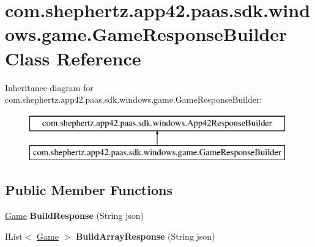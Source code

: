 \hypertarget{classcom_1_1shephertz_1_1app42_1_1paas_1_1sdk_1_1windows_1_1game_1_1_game_response_builder}{\section{com.\+shephertz.\+app42.\+paas.\+sdk.\+windows.\+game.\+Game\+Response\+Builder Class Reference}
\label{classcom_1_1shephertz_1_1app42_1_1paas_1_1sdk_1_1windows_1_1game_1_1_game_response_builder}
}
Inheritance diagram for com.\+shephertz.\+app42.\+paas.\+sdk.\+windows.\+game.\+Game\+Response\+Builder\+:\begin{figure}[H]
\begin{center}
\leavevmode
\includegraphics[height=2.000000cm]{classcom_1_1shephertz_1_1app42_1_1paas_1_1sdk_1_1windows_1_1game_1_1_game_response_builder}
\end{center}
\end{figure}
\subsection*{Public Member Functions}
\begin{DoxyCompactItemize}
\item 
\hypertarget{classcom_1_1shephertz_1_1app42_1_1paas_1_1sdk_1_1windows_1_1game_1_1_game_response_builder_a592407f2cab7b47824fb96970491159e}{\hyperlink{classcom_1_1shephertz_1_1app42_1_1paas_1_1sdk_1_1windows_1_1game_1_1_game}{Game} {\bfseries Build\+Response} (String json)}\label{classcom_1_1shephertz_1_1app42_1_1paas_1_1sdk_1_1windows_1_1game_1_1_game_response_builder_a592407f2cab7b47824fb96970491159e}

\item 
\hypertarget{classcom_1_1shephertz_1_1app42_1_1paas_1_1sdk_1_1windows_1_1game_1_1_game_response_builder_a359e4c7fc9e87e61b3fef16704c08fef}{I\+List$<$ \hyperlink{classcom_1_1shephertz_1_1app42_1_1paas_1_1sdk_1_1windows_1_1game_1_1_game}{Game} $>$ {\bfseries Build\+Array\+Response} (String json)}\label{classcom_1_1shephertz_1_1app42_1_1paas_1_1sdk_1_1windows_1_1game_1_1_game_response_builder_a359e4c7fc9e87e61b3fef16704c08fef}

\end{DoxyCompactItemize}
